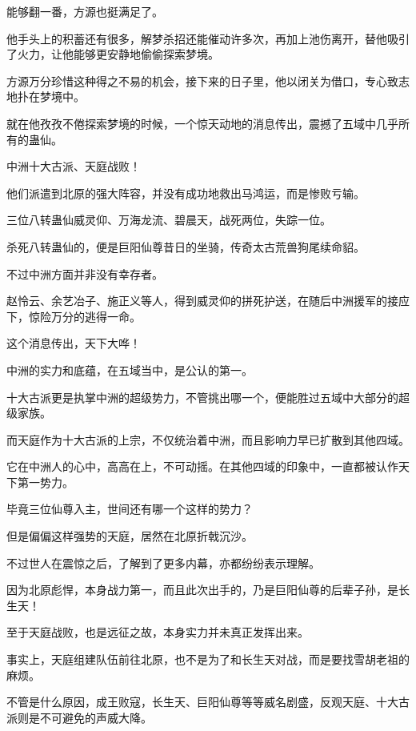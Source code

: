 \begin{this_body}
能够翻一番，方源也挺满足了。

他手头上的积蓄还有很多，解梦杀招还能催动许多次，再加上池伤离开，替他吸引了火力，让他能够更安静地偷偷探索梦境。

方源万分珍惜这种得之不易的机会，接下来的日子里，他以闭关为借口，专心致志地扑在梦境中。

就在他孜孜不倦探索梦境的时候，一个惊天动地的消息传出，震撼了五域中几乎所有的蛊仙。

中洲十大古派、天庭战败！

他们派遣到北原的强大阵容，并没有成功地救出马鸿运，而是惨败亏输。

三位八转蛊仙威灵仰、万海龙流、碧晨天，战死两位，失踪一位。

杀死八转蛊仙的，便是巨阳仙尊昔日的坐骑，传奇太古荒兽狗尾续命貂。

不过中洲方面并非没有幸存者。

赵怜云、余艺冶子、施正义等人，得到威灵仰的拼死护送，在随后中洲援军的接应下，惊险万分的逃得一命。

这个消息传出，天下大哗！

中洲的实力和底蕴，在五域当中，是公认的第一。

十大古派更是执掌中洲的超级势力，不管挑出哪一个，便能胜过五域中大部分的超级家族。

而天庭作为十大古派的上宗，不仅统治着中洲，而且影响力早已扩散到其他四域。

它在中洲人的心中，高高在上，不可动摇。在其他四域的印象中，一直都被认作天下第一势力。

毕竟三位仙尊入主，世间还有哪一个这样的势力？

但是偏偏这样强势的天庭，居然在北原折戟沉沙。

不过世人在震惊之后，了解到了更多内幕，亦都纷纷表示理解。

因为北原彪悍，本身战力第一，而且此次出手的，乃是巨阳仙尊的后辈子孙，是长生天！

至于天庭战败，也是远征之故，本身实力并未真正发挥出来。

事实上，天庭组建队伍前往北原，也不是为了和长生天对战，而是要找雪胡老祖的麻烦。

不管是什么原因，成王败寇，长生天、巨阳仙尊等等威名剧盛，反观天庭、十大古派则是不可避免的声威大降。

\end{this_body}

